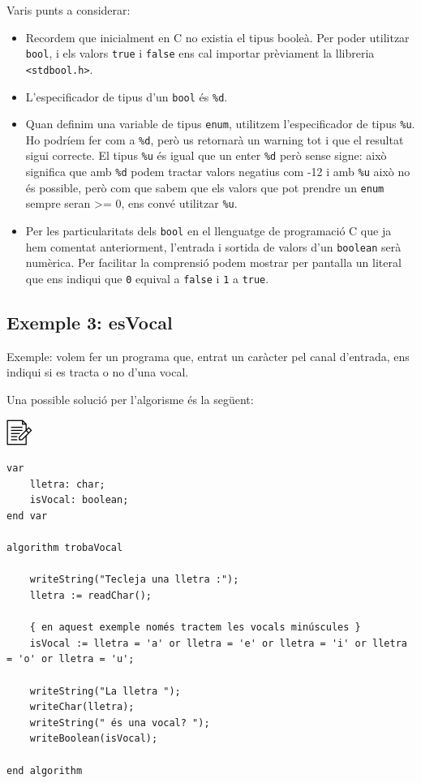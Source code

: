 \documentclass[]{book}
\providecommand{\tightlist}{%
  \setlength{\itemsep}{0pt}\setlength{\parskip}{0pt}}
\begin{document}
Varis punts a considerar:

\begin{itemize}
\tightlist
\item
  Recordem que inicialment en C no existia el tipus booleà. Per poder
  utilitzar \texttt{bool}, i els valors \texttt{true} i \texttt{false}
  ens cal importar prèviament la llibreria
  \texttt{\textless{}stdbool.h\textgreater{}}.
\item
  L'especificador de tipus d'un \texttt{bool} és \texttt{\%d}.
\item
  Quan definim una variable de tipus \texttt{enum}, utilitzem
  l'especificador de tipus \texttt{\%u}. Ho podríem fer com a
  \texttt{\%d}, però us retornarà un warning tot i que el resultat sigui
  correcte. El tipus \texttt{\%u} és igual que un enter \texttt{\%d}
  però sense signe: això significa que amb \texttt{\%d} podem tractar
  valors negatius com -12 i amb \texttt{\%u} això no és possible, però
  com que sabem que els valors que pot prendre un \texttt{enum} sempre
  seran \textgreater{}= 0, ens convé utilitzar \texttt{\%u}.
\item
  Per les particularitats dels \texttt{bool} en el llenguatge de
  programació C que ja hem comentat anteriorment, l'entrada i sortida de
  valors d'un \texttt{boolean} serà numèrica. Per facilitar la
  comprensió podem mostrar per pantalla un literal que ens indiqui que
  \texttt{0} equival a \texttt{false} i \texttt{1} a \texttt{true}.
\end{itemize}

\subsection{Exemple 3: esVocal}\label{exemple-3-esvocal}

Exemple: volem fer un programa que, entrat un caràcter pel canal
d'entrada, ens indiqui si es tracta o no d'una vocal.

Una possible solució per l'algorisme és la següent:

\includegraphics{./img/alg.png}

\begin{verbatim}
var
    lletra: char;
    isVocal: boolean;
end var

algorithm trobaVocal

    writeString("Tecleja una lletra :");
    lletra := readChar();

    { en aquest exemple només tractem les vocals minúscules }
    isVocal := lletra = 'a' or lletra = 'e' or lletra = 'i' or lletra = 'o' or lletra = 'u';

    writeString("La lletra ");
    writeChar(lletra);
    writeString(" és una vocal? ");
    writeBoolean(isVocal);

end algorithm
\end{verbatim}
\end{document}
